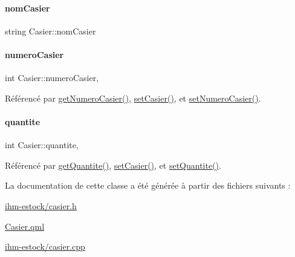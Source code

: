 \mbox{\label{class_casier_ac4b85818b807b9f775123b202945c8ab}} 
\paragraph{\texorpdfstring{nom\+Casier}{nomCasier}}
{\footnotesize\ttfamily string Casier\+::nom\+Casier}

\mbox{\label{class_casier_abc4e6c9bde55c9b703ea53d85b6b1219}} 
\paragraph{\texorpdfstring{numero\+Casier}{numeroCasier}}
{\footnotesize\ttfamily int Casier\+::numero\+Casier\hspace{0.3cm}{\ttfamily [read]}, {\ttfamily [write]}}



Référencé par \hyperlink{class_casier_a77004d988048cf4c8ad521800745be73}{get\+Numero\+Casier()}, \hyperlink{class_casier_a140dc38c9e87815b2ce7fc6dce33080b}{set\+Casier()}, et \hyperlink{class_casier_a5ae4ea249ab63e1ad44af87fb019a6b0}{set\+Numero\+Casier()}.

\mbox{\label{class_casier_acf950b0ab2ee437a9dbc8c6b66432b4c}} 
\paragraph{\texorpdfstring{quantite}{quantite}}
{\footnotesize\ttfamily int Casier\+::quantite\hspace{0.3cm}{\ttfamily [read]}, {\ttfamily [write]}}



Référencé par \hyperlink{class_casier_ad4b3ee57fdc7240b2a895b7f70f4cd11}{get\+Quantite()}, \hyperlink{class_casier_a140dc38c9e87815b2ce7fc6dce33080b}{set\+Casier()}, et \hyperlink{class_casier_a41aee5f476516dc87b66674c6b9c6d4b}{set\+Quantite()}.



La documentation de cette classe a été générée à partir des fichiers suivants \+:\begin{DoxyCompactItemize}
\item 
\hyperlink{ihm-estock_2casier_8h}{ihm-\/estock/casier.\+h}\item 
\hyperlink{_casier_8qml}{Casier.\+qml}\item 
\hyperlink{ihm-estock_2casier_8cpp}{ihm-\/estock/casier.\+cpp}\end{DoxyCompactItemize}
